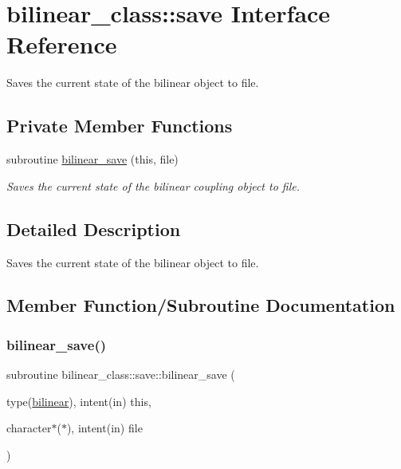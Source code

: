 \hypertarget{interfacebilinear__class_1_1save}{}\section{bilinear\+\_\+class\+:\+:save Interface Reference}
\label{interfacebilinear__class_1_1save}


Saves the current state of the bilinear object to file.  


\subsection*{Private Member Functions}
\begin{DoxyCompactItemize}
\item 
subroutine \hyperlink{interfacebilinear__class_1_1save_a11cfc8e527c10b54357d68cdb4c635ce}{bilinear\+\_\+save} (this, file)
\begin{DoxyCompactList}\small\item\em Saves the current state of the bilinear coupling object to file. \end{DoxyCompactList}\end{DoxyCompactItemize}


\subsection{Detailed Description}
Saves the current state of the bilinear object to file. 

\subsection{Member Function/\+Subroutine Documentation}
\mbox{\label{interfacebilinear__class_1_1save_a11cfc8e527c10b54357d68cdb4c635ce}} 
\subsubsection{\texorpdfstring{bilinear\+\_\+save()}{bilinear\_save()}}
{\footnotesize\ttfamily subroutine bilinear\+\_\+class\+::save\+::bilinear\+\_\+save (\begin{DoxyParamCaption}\item[{type(\hyperlink{structbilinear__class_1_1bilinear}{bilinear}), intent(in)}]{this,  }\item[{character$\ast$($\ast$), intent(in)}]{file }\end{DoxyParamCaption})\hspace{0.3cm}{\ttfamily [private]}}



